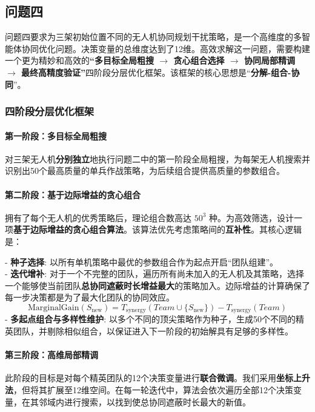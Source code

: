 \documentclass[12pt]{article}
\begin{document}
\begin{CJK}{UTF8}{gbsn}
		\subsection{问题四}
		
		
		问题四要求为三架初始位置不同的无人机协同规划干扰策略，是一个高维度的多智能体协同优化问题。决策变量的总维度达到了12维。高效求解这一问题，需要构建一个更为精妙和高效的\textbf{“多目标全局粗搜 $\rightarrow$ 贪心组合选择 $\rightarrow$ 协同局部精调 $\rightarrow$ 最终高精度验证”}四阶段分层优化框架。该框架的核心思想是“\textbf{分解-组合-协同}”。
		
		\subsubsection{四阶段分层优化框架}
		\paragraph{第一阶段：多目标全局粗搜}
		对三架无人机\textbf{分别独立}地执行问题二中的第一阶段全局粗搜，为每架无人机搜索并识别出50个最高质量的单兵作战策略，为后续组合提供高质量的参数组合。
		
		\paragraph{第二阶段：基于边际增益的贪心组合}
		拥有了每个无人机的优秀策略后，理论组合数高达 $50^3$ 种。为高效筛选，设计一项\textbf{基于边际增益的贪心组合算法}。该算法优先考虑策略间的\textbf{互补性}。其核心逻辑是：
		
		\indent - \textbf{种子选择}: 以所有单机策略中最优的参数组合作为起点开启“团队组建”。\\
		\indent - \textbf{迭代增补}: 对于一个不完整的团队，遍历所有尚未加入的无人机及其策略，选择一个能够使当前团队\textbf{总协同遮蔽时长增益最大}的策略加入。边际增益的计算确保了每一步决策都是为了最大化团队的协同效应。\\
		\begin{equation}
			\text{MarginalGain}(S_{\text{new}}) = T_{\text{synergy}}(Team \cup \{S_{\text{new}}\}) - T_{\text{synergy}}(Team)
		\end{equation}
		\indent - \textbf{多起点组合与多样性维护}: 以多个不同的顶尖策略作为种子，生成50个不同的精英团队，并剔除相似组合，以保证进入下一阶段的初始解具有足够的多样性。
		
		
		\paragraph{第三阶段：高维局部精调}
		此阶段的目标是对每个精英团队的12个决策变量进行\textbf{联合微调}。我们采用\textbf{坐标上升法}，但将其扩展至12维空间。在每一轮迭代中，算法会依次遍历全部12个决策变量，在其邻域内进行搜索，以找到使总协同遮蔽时长最大的新值。
		

\end{CJK}
\end{document}
